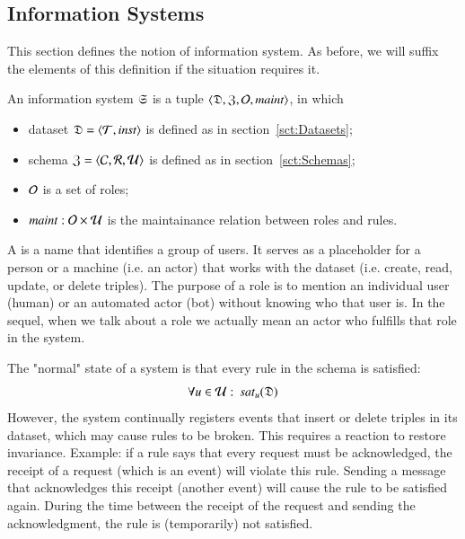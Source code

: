 \documentclass{elsarticle}
\begin{document}
\subsection{Information Systems}
\label{sct:Information Systems}
   This section defines the notion of information system.
   As before, we will suffix the elements of this definition if the situation requires it.
\begin{definition}
\label{def:information system}
\item An information system $\mathfrak{S}$ is a tuple $\langle\mathfrak{D},\mathfrak{Z},\mathcal{O},\text{\it maint\/}\rangle$, in which
\begin{itemize}
   \item dataset $\mathfrak{D}=\langle{\mathcal{T}},{\text{\it inst\/}}\rangle$ is defined as in section~\ref{sct:Datasets};
   \item schema $\mathfrak{Z}=\langle{\mathcal{C}},{\mathcal{R}},{\mathcal{U}}\rangle$ is defined as in section~\ref{sct:Schemas};
   \item $\mathcal{O}$ is a set of roles;
   \item $\text{\it maint\/} : \mathcal{O}\times\mathcal{U}$ is the maintainance relation between roles and rules.
\end{itemize}
\end{definition}
   A  is a name that identifies a group of users.
   It serves as a placeholder for a person or a machine (i.e. an actor) that works with the dataset (i.e. create, read, update, or delete triples).
   The purpose of a role is to mention an individual user (human) or an automated actor (bot) without knowing who that user is.
   In the sequel, when we talk about a role we actually mean an actor who fulfills that role in the system.

   The "normal" state of a system is that every rule in the schema is satisfied:
\begin{equation}
   \forall u\in\rules:\ \sat{u}{\dataset}\label{eqn:satisfaction}
\end{equation}
   However, the system continually registers events that insert or delete triples in its dataset,
   which may cause rules to be broken.
   This requires a reaction to restore invariance.
   Example: if a rule says that every request must be acknowledged, the receipt of a request (which is an event) will violate this rule.
   Sending a message that acknowledges this receipt (another event) will cause the rule to be satisfied again.
   During the time between the receipt of the request and sending the acknowledgment, the rule is (temporarily) not satisfied.
\end{document}
